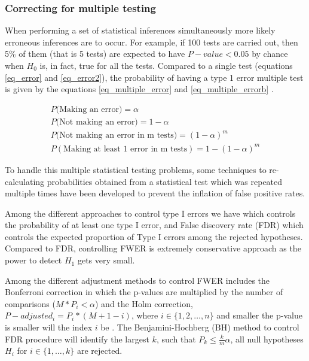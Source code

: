 \subsubsection{Correcting for multiple testing}

When performing  a set of statistical inferences simultaneously more likely erroneous inferences are to occur.
For example, if 100 tests are carried
out, then 5\% of them (that is 5 tests) are expected to
have $P-value < 0.05$ by chance when $H_0$ is, in fact, true for all the tests.
Compared to a single test (equations \ref{eq_error} and \ref{eq_error2}), the probability of having a type 1 error multiple test is given by the equations \ref{eq_multiple_error} and \ref{eq_multiple_errorb} \cite{vsidak1967rectangular}.

\begin{subequations}

\begin{align}
  P(\textrm{Making an error)} = \alpha \label{eq_error}\\
  P(\textrm{Not making an error)} = 1 - \alpha \label{eq_error2}\\
  P(\textrm{Not making an error in m tests)} = (1 - \alpha)^m  \label{eq_multiple_error}\\
  P(\textrm{Making at least 1 error in m tests}) = 1 - (1 - \alpha)^m  \label{eq_multiple_errorb}
\end{align}
\end{subequations}

To handle this multiple statistical testing problems,
some techniques  to re-calculating probabilities obtained from a statistical test which was repeated multiple times
have been developed to prevent the inflation of false positive rates.


Among the different approaches to control type I errors we have
 which controls the probability of at least one type I error,
and False discovery rate (FDR)
which controls the expected proportion of Type I errors
among the rejected hypotheses. Compared to FDR, controlling FWER is extremely conservative
approach as the power to detect $H_1$ gets very small.

Among the different adjustment methods to control FWER includes the Bonferroni correction
  in which the p-values are multiplied by the number of comparisons ($M * P_i < \alpha$) and the Holm correction, $P-adjusted_i = P_i * (M + 1 - i)$, where $i \in \{1,2,\dots,n\}$ and smaller the p-value is smaller will the index $i$ be \cite{aickin1996adjusting}.
 The Benjamini-Hochberg (BH) method to control FDR procedure will identify the largest $k$,
 such that $P_k \leq \frac{k}{m}\alpha$, all null hypotheses $H_i$ for $i \in \{1,\ldots,k\}$ are rejected.



